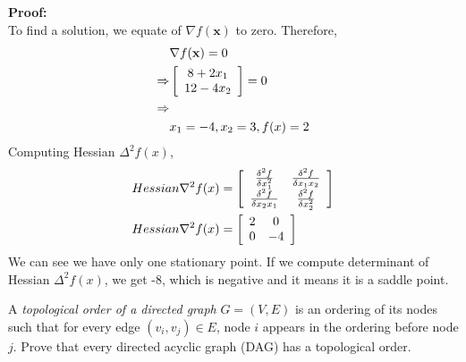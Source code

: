 \documentclass[a4paper,10pt]{article}
\begin{document}
\begin{enumerate}
\begin{taskbox}
    \end{taskbox}
    \\ \\ \textbf{Proof:} \\
    To find a solution, we equate  of $\nabla f(\mathbf{x})$ to zero.  Therefore,
    \begin{equation}
        \begin{split}
                & \nabla f(\mathbf{x}) = 0 \\
               \Rightarrow & \left[\begin{array}{c c} 8 + 2x_1 \\ 12-4x_2 \end{array} \right] = 0 \\
               \Rightarrow & \\
               & x_1 = -4, x_2 = 3, f(x) = 2
        \end{split}
    \end{equation}
    Computing Hessian $\Delta^2 f(x)$,
    \begin{equation}
        \begin{split}
          Hessian \nabla^2f(x) & = \left[\begin{array}{c c} \frac{\delta^2f}{\delta x_1^2} &\frac{\delta^2f}{\delta x_1x_2}  \\  \frac{\delta^2f}{\delta x_2x_1}  &\frac{\delta^2f}{\delta x_2^2} \end{array} \right] \\
          Hessian \nabla^2f(x) & = \left[\begin{array}{c c} 2  &0  \\ 0  &-4 \end{array} \right]
        \end{split}
    \end{equation}
    We can see we have only one stationary point. If we compute determinant of Hessian $\Delta^2 f(x)$, we get -8, which is negative and it means it is a saddle point.
    \newpage
    \begin{taskbox}
    A \emph{topological order of a directed graph} $G=(V, E)$ is an ordering of its nodes such that for every edge $(v_i, v_j) \in E$, node $i$ appears in the ordering before node $j$. Prove that every directed acyclic graph (DAG) has a topological order. \\[5pt]
    

\end{taskbox}
\end{enumerate}
\end{document}
